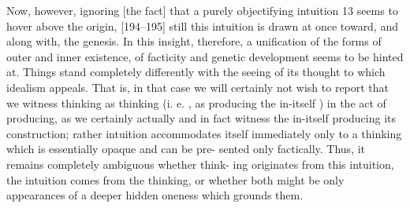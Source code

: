 Now, however, ignoring [the fact] that a purely objectifying intuition 13 seems
to hover above the origin, [194–195] still this intuition is drawn at once
toward, and along with, the genesis.
In this insight, therefore, a unification of
the forms of outer and inner existence, of facticity and genetic development
seems to be hinted at.
Things stand completely differently with the seeing of
its thought to which idealism appeals.
That is, in that case we will certainly
not wish to report that we witness thinking as thinking (i.
e.
, as producing the
in-itself ) in the act of producing, as we certainly actually and in fact witness
the in-itself producing its construction; rather intuition accommodates itself
immediately only to a thinking which is essentially opaque and can be pre-
sented only factically.
Thus, it remains completely ambiguous whether think-
ing originates from this intuition, the intuition comes from the thinking, or
whether both might be only appearances of a deeper hidden oneness which
grounds them.


